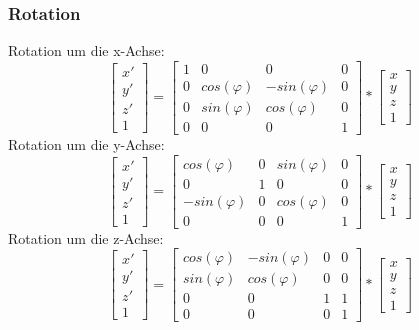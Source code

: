 \documentclass[10pt]{article}
\begin{document}
\subsubsection{Rotation}
Rotation um die x-Achse:
\begin{equation}
\begin{bmatrix} x' \\ y' \\ z'\\ 1\end{bmatrix}
= \begin{bmatrix}
1 & 0 & 0 & 0\\	
0 & cos(\varphi) & -sin(\varphi) & 0 \\
0 & sin(\varphi) & cos(\varphi)  & 0\\
0 & 0 & 0 & 1
\end{bmatrix} * \begin{bmatrix} x \\ y  \\ z\\ 1\end{bmatrix}\end{equation}
Rotation um die y-Achse:
\begin{equation}
\begin{bmatrix} x' \\ y' \\ z'\\ 1\end{bmatrix}
= \begin{bmatrix}
cos(\varphi) & 0  & sin(\varphi) & 0 \\
0 & 1 & 0 & 0 \\
-sin(\varphi) & 0 & cos(\varphi)  & 0\\
0 & 0 & 0 & 1
\end{bmatrix} * \begin{bmatrix} x \\ y  \\ z\\ 1\end{bmatrix}\end{equation}
Rotation um die z-Achse:
\begin{equation}
\begin{bmatrix} x' \\ y' \\ z'\\ 1\end{bmatrix}
= \begin{bmatrix}
cos(\varphi) & -sin(\varphi) & 0 & 0 \\
sin(\varphi) & cos(\varphi) & 0 & 0\\
0 & 0 & 1 & 1\\
0 & 0 & 0 & 1
\end{bmatrix} * \begin{bmatrix} x \\ y  \\ z\\ 1\end{bmatrix}\end{equation}
\end{document}
